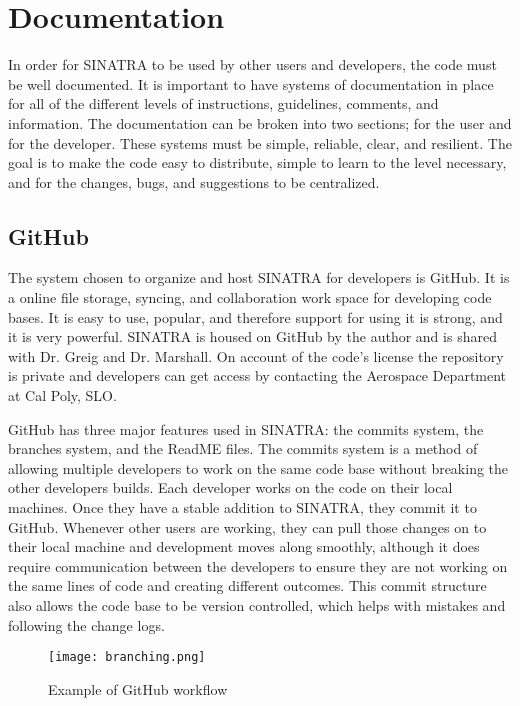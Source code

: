 \section{Documentation}
In order for SINATRA to be used by other users and developers, the code must be well documented. It is important to have systems of documentation in place for all of the different levels of instructions, guidelines, comments, and information. The documentation  can be broken into two sections; for the user and for the developer. These systems must be simple, reliable, clear, and resilient. The goal is to make the code easy to distribute, simple to learn to the level necessary, and for the changes, bugs, and suggestions to be centralized.

\subsection{GitHub}
The system chosen to organize and host SINATRA for developers is GitHub. It is a online file storage, syncing, and collaboration work space for developing code bases. It is easy to use, popular, and therefore support for using it is strong, and it is very powerful. SINATRA is housed on GitHub by the author and is shared with Dr. Greig and Dr. Marshall. On account of the code’s license the repository is private and developers can get access by contacting the Aerospace Department at Cal Poly, SLO. \par
\indent GitHub has three major features used in SINATRA: the commits system, the branches system, and the ReadME files. The commits system is a method of allowing multiple developers to work on the same code base without breaking the other developers builds. Each developer works on the code on their local machines. Once they have a stable addition to SINATRA, they commit it to GitHub. Whenever other users are working, they can pull those changes on to their local machine and development moves along smoothly, although it does require communication between the developers to ensure they are not working on the same lines of code and creating different outcomes. This commit structure also allows the code base to be version controlled, which helps  with mistakes and following the change logs. \par


\begin{figure}
\texttt{[image: branching.png]}
\centering
\caption{Example of GitHub workflow}
\label{fig:github}
\end{figure}


